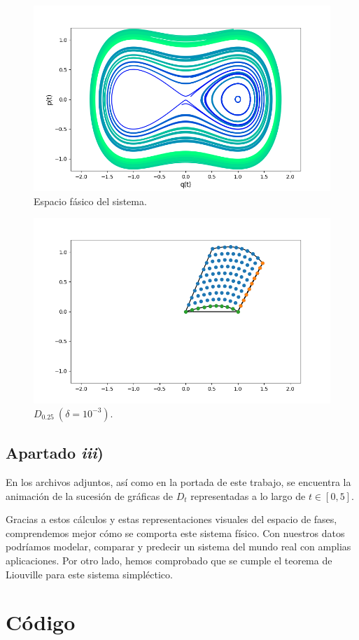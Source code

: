 \documentclass[a4paper]{article}
\begin{document}
	\begin{multicols}{2}
		\begin{figure}[H]
			\centering
			\includegraphics[width=0.95\linewidth]{1}
			\caption{Espacio fásico del sistema.}\label{fig:1}
		\end{figure}
		
		\begin{figure}[H]
			\centering
			\includegraphics[width=0.95\linewidth]{figs/2-0.001000.png}
			\caption{$D_{0.25}\ (\delta = 10^{-3})$.}\label{fig:2}
		\end{figure}
	\end{multicols}
	
	
	\subsection{Apartado \textit{iii})}
	En los archivos adjuntos, así como en la portada de este trabajo, se encuentra la animación de la sucesión de gráficas de $D_t$ representadas a lo largo de $t\in[0,5]$.
	
	Gracias a estos cálculos y estas representaciones visuales del espacio de fases, comprendemos mejor cómo se comporta este sistema físico. Con nuestros datos podríamos modelar, comparar y predecir un sistema del mundo real con amplias aplicaciones. Por otro lado, hemos comprobado que se cumple el teorema de Liouville para este sistema simpléctico.
	
	\newpage
	\section{Código}\label{codigo}
	
	
	
\end{document}
